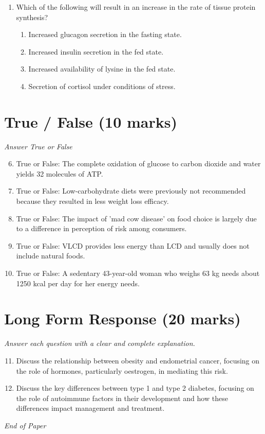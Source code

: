 \documentclass[12pt]{article}
\begin{document}
\begin{enumerate}[label=\arabic*.]
\begin{enumerate}[label=(\alph*)]
    \item Controlled animal studies provide more reliable information
    \item Reliable dose-response data are difficult to acquire and often unavailable
\end{enumerate}
\item Which of the following will result in an increase in the rate of tissue protein synthesis?
\begin{enumerate}[label=(\alph*)]
    \item Increased glucagon secretion in the fasting state.
    \item Increased insulin secretion in the fed state.
    \item Increased availability of lysine in the fed state.
    \item Secretion of cortisol under conditions of stress.
\end{enumerate}
\end{enumerate}

\section*{True / False (10 marks)}
\textit{Answer True or False}
\begin{enumerate}[label=\arabic*.]
\setcounter{enumi}{5}
\item True or False: The complete oxidation of glucose to carbon dioxide and water yields 32 molecules of ATP.
\item True or False: Low-carbohydrate diets were previously not recommended because they resulted in less weight loss efficacy.
\item True or False: The impact of 'mad cow disease' on food choice is largely due to a difference in perception of risk among consumers.
\item True or False: VLCD provides less energy than LCD and usually does not include natural foods.
\item True or False: A sedentary 43-year-old woman who weighs 63 kg needs about 1250 kcal per day for her energy needs.
\end{enumerate}

\section*{Long Form Response (20 marks)}
\textit{Answer each question with a clear and complete explanation.}
\begin{enumerate}[label=\arabic*.]
\setcounter{enumi}{10}
\item Discuss the relationship between obesity and endometrial cancer, focusing on the role of hormones, particularly oestrogen, in mediating this risk.
\item Discuss the key differences between type 1 and type 2 diabetes, focusing on the role of autoimmune factors in their development and how these differences impact management and treatment.
\end{enumerate}

\vfill
\noindent\textit{End of Paper}
\end{document}
